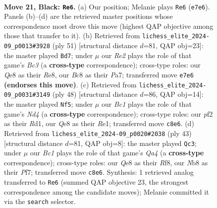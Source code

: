 \documentclass[11pt]{article}
\begin{document}
\clearpage

\begin{figure}[p]\centering
\begin{subfigure}{0.46\textwidth}\centering
\resizebox{\linewidth}{!}{%
\newchessgame
\chessboard[
  setfen={rnb1q1k1/1p2r1pp/8/p2QNp2/8/2B1P1P1/P4P1P/1R2R1K1 b - - 0 21},
  showmover=false,
  pgfstyle=straightmove, color=movearrow, markmove={e7-e6}
]}
\caption{}
\end{subfigure}\hfill
\begin{subfigure}{0.46\textwidth}\centering
\resizebox{\linewidth}{!}{%
\newchessgame
\chessboard[
  setfen={4r1k1/pp2qppp/2b5/4r3/4pQ2/2P1R1N1/PP3PPP/3R2K1 b - - 8 26},
  showmover=false,
  pgfstyle=straightmove, color=movearrow, markmove={c6-d7}
]}
\caption{}
\end{subfigure}
\\[4pt]
\begin{subfigure}{0.46\textwidth}\centering
\resizebox{\linewidth}{!}{%
\newchessgame
\chessboard[
  setfen={2k1r2r/1ppn2Q1/p7/2q3Pp/2pNP3/7b/PPB2P2/3RR1K1 w - - 0 25},
  showmover=false,
  pgfstyle=straightmove, color=movearrow, markmove={d4-f5}
]}
\caption{}
\end{subfigure}\hfill
\begin{subfigure}{0.46\textwidth}\centering
\resizebox{\linewidth}{!}{%
\newchessgame
\chessboard[
  setfen={1r3rk1/p4pp1/4b2p/q2p4/3Q4/1p4P1/nN2PPBP/R2R2K1 b - - 1 22},
  showmover=false,
  pgfstyle=straightmove, color=movearrow, markmove={a5-c3}
]}
\caption{}
\end{subfigure}
\caption{\textbf{Move 21, Black: \texttt{Re6}.} (a) Our position; Melanie plays \texttt{Re6} (\texttt{e7e6}). Panels (b)--(d) are the retrieved master positions whose correspondence most drove this move (highest QAP objective among those that transfer to it). (b) Retrieved from \texttt{lichess\_elite\_2024-09\_p0013\#3928} (ply 51) [structural distance $d$=81, QAP obj=23]: the master played \texttt{Bd7}; under $\mu$ our \emph{Re2} plays the role of that game's \emph{Bc3} (a \textbf{cross-type} correspondence); cross-type roles: our \emph{Q}e8 as their \emph{R}e8, our \emph{B}c8 as their \emph{P}a7; transferred move \texttt{e7e6} \textbf{(endorses this move)}. (c) Retrieved from \texttt{lichess\_elite\_2024-09\_p0031\#3149} (ply 48) [structural distance $d$=86, QAP obj=14]: the master played \texttt{Nf5}; under $\mu$ our \emph{Bc1} plays the role of that game's \emph{Nd4} (a \textbf{cross-type} correspondence); cross-type roles: our \emph{p}f2 as their \emph{R}d1, our \emph{Q}e8 as their \emph{R}e1; transferred move \texttt{c8e6}. (d) Retrieved from \texttt{lichess\_elite\_2024-09\_p0020\#2038} (ply 43) [structural distance $d$=81, QAP obj=8]: the master played \texttt{Qc3}; under $\mu$ our \emph{Bc1} plays the role of that game's \emph{Qa4} (a \textbf{cross-type} correspondence); cross-type roles: our \emph{Q}e8 as their \emph{R}f8, our \emph{N}b8 as their \emph{P}f7; transferred move \texttt{c8e6}. Synthesis: 1 retrieved analog transferred to \texttt{Re6} (summed QAP objective 23, the strongest correspondence among the candidate moves); Melanie committed it via the \texttt{search} selector.}
\label{fig:thought-m41}
\end{figure}
\end{document}
